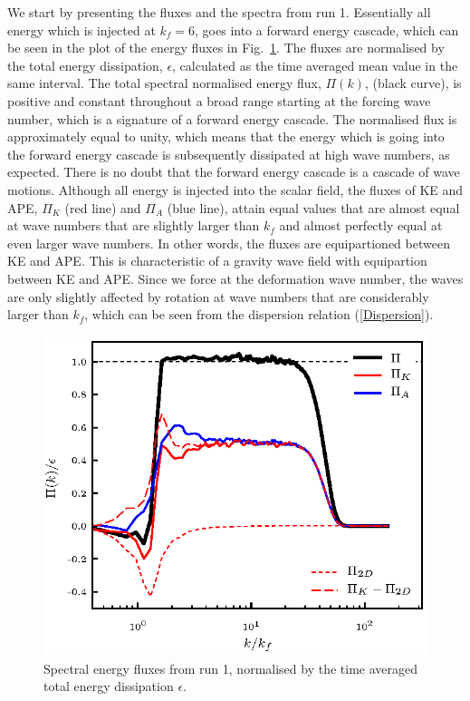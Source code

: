 { We start by presenting the fluxes and the spectra from run 1. }Essentially all energy which is injected at $ k_f  =6 $, goes into a forward energy cascade, which can be seen in the plot of the energy fluxes in Fig.~\ref{F1}. The fluxes are normalised by the total energy dissipation, $ \epsilon $, calculated as the time averaged mean value in the same interval.  The total spectral normalised energy flux, $ \Pi(k) $, (black curve), is positive and constant throughout a broad range starting at the forcing wave number,  which is a signature of a forward energy cascade. The normalised flux is approximately equal to unity, which means that the energy which is going into the forward energy cascade is subsequently dissipated at high wave numbers, as expected. There is no doubt that the forward energy cascade is a cascade of wave motions. Although all energy is injected into the scalar field, the fluxes of KE and APE, $ \Pi_K $ (red line) and $ \Pi_A $ (blue line), attain equal values that are almost equal at wave numbers that are slightly larger than $ k_f $ and almost perfectly equal at even larger wave numbers.  In other words, the fluxes are equipartioned between KE and APE. This is characteristic of a gravity wave field with equipartion between KE and APE. 
Since we force at the deformation wave number, the waves are only slightly affected by rotation at wave numbers that are considerably larger than $ k_f $, which can be seen from the dispersion relation (\ref{Dispersion}). 

\begin{figure}[h]
\centerline{\includegraphics[angle=0]{./fig2.eps}}
 \caption{Spectral energy fluxes from run 1, normalised by the time averaged total energy dissipation $ \epsilon $.  }
 \label{F1}
 \end{figure}

